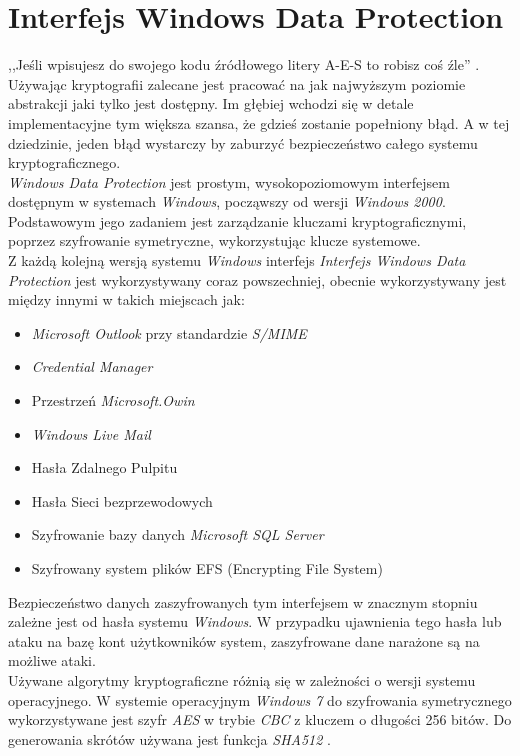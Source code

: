 \section{Interfejs Windows Data Protection}
,,Jeśli wpisujesz do swojego kodu źródłowego litery A-E-S to robisz coś źle'' \cite{lettersaes}. 
Używając kryptografii zalecane jest pracować na jak najwyższym poziomie abstrakcji jaki tylko 
jest dostępny. Im głębiej wchodzi się w detale implementacyjne tym większa szansa, że 
gdzieś zostanie popełniony błąd. A w tej dziedzinie, jeden błąd wystarczy by zaburzyć 
bezpieczeństwo całego systemu kryptograficznego. \\
\textit{Windows Data Protection} jest prostym, wysokopoziomowym interfejsem dostępnym w systemach 
\textit{Windows}, począwszy od wersji \textit{Windows 2000}. 
Podstawowym jego zadaniem jest zarządzanie kluczami kryptograficznymi, poprzez szyfrowanie symetryczne,
wykorzystując klucze systemowe. \\ 
Z każdą kolejną wersją systemu \textit{Windows} interfejs \textit{Interfejs Windows Data Protection} 
jest wykorzystywany coraz powszechniej, obecnie wykorzystywany jest między innymi w takich miejscach jak:
\begin{itemize}
	\item \textit{Microsoft Outlook} przy standardzie \textit{S/MIME}
	\item \textit{Credential Manager}
	\item Przestrzeń \textit{Microsoft.Owin} 
	\item \textit{Windows Live Mail}
	\item Hasła Zdalnego Pulpitu
	\item Hasła Sieci bezprzewodowych
	\item Szyfrowanie bazy danych \textit{Microsoft SQL Server} 
	\item Szyfrowany system plików EFS (Encrypting File System)
\end{itemize}
Bezpieczeństwo danych zaszyfrowanych tym interfejsem w znacznym stopniu zależne jest od hasła 
systemu \textit{Windows}. W przypadku ujawnienia tego hasła lub ataku na bazę kont użytkowników system,
zaszyfrowane dane narażone są na możliwe ataki. \\
Używane algorytmy kryptograficzne różnią się w zależności o wersji systemu operacyjnego. 
W systemie operacyjnym \textit{Windows 7} do szyfrowania symetrycznego wykorzystywane jest szyfr \textit{AES} 
w trybie \textit{CBC} z kluczem o długości 256 bitów. 
Do generowania skrótów używana jest funkcja \textit{SHA512} \cite{dpapi}.
